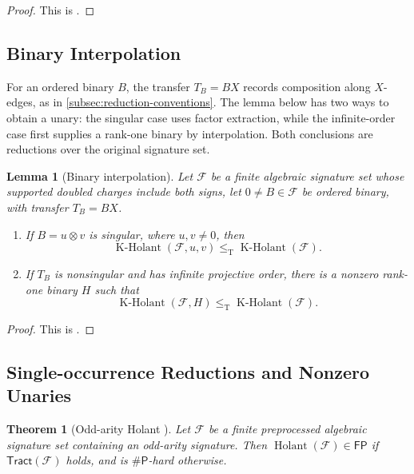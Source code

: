 \documentclass[11pt,letterpaper,onecolumn]{article}
\theoremstyle{plain}
\newtheorem{theorem}{Theorem}[section]
\newtheorem{lemma}[lemma]{Lemma}
\theoremstyle{definition}
\theoremstyle{remark}
\newcommand{\cF}{\mathcal F}
\newcommand{\Holant}{\operatorname{Holant}}
\newcommand{\KHolant}{\operatorname{K\text{-}Holant}}
\newcommand{\Tract}{\mathsf{Tract}}
\newcommand{\FP}{\mathsf{FP}}
\newcommand{\SharpP}{\#\mathsf P}
\newcommand{\leT}{\leq_{\mathrm T}}
\begin{document}
	\begin{proof}
		This is \cite[Lemma~2.25]{Liu2026DEQ2Holant}.
	\end{proof}
	
	
	\subsection{Binary Interpolation}
	\label{proofsubsec:central-descent}

For an ordered binary \(B\), the transfer \(T_B=BX\) records composition
along \(X\)-edges, as in \cref{subsec:reduction-conventions}.
The lemma below has two ways to obtain a unary: the singular case uses
factor extraction, while the infinite-order case first supplies a rank-one
binary by interpolation.  Both conclusions are reductions over the
original signature set.
	
	\begin{lemma}[Binary interpolation]
		\label{lem:binary-interpolation}
		Let \(\cF\) be a finite algebraic signature set whose supported doubled
		charges include both signs, let
		\(0\ne B\in\cF\) be ordered binary, with transfer \(T_B=BX\).
		\begin{enumerate}
			\item If \(B=u\otimes v\) is singular, where \(u,v\ne0\), then
			\[
			\KHolant(\cF,u,v)\leT\KHolant(\cF).
			\]
			\item If \(T_B\) is nonsingular and has infinite projective order, there is
			a nonzero rank-one binary \(H\) such that
			\[
			\KHolant(\cF,H)\leT\KHolant(\cF).
			\]
		\end{enumerate}
	\end{lemma}
	
	\begin{proof}
		This is \cite[Lemma~3.1]{Liu2026DEQ2Holant}.
	\end{proof}
	
	\subsection{Single-occurrence Reductions and Nonzero Unaries}
	\label{subsec:single-occurrence-carriers}

	\begin{theorem}[Odd-arity Holant
		{\cite[full version, Theorem~33; conference version, Theorem~30]{MengWangXiaZheng2025}}]
		\label{thm:external-odd}
		Let \(\cF\) be a finite preprocessed algebraic signature set containing an
		odd-arity signature.  Then \(\Holant(\cF)\in\FP\) if
		\(\Tract(\cF)\) holds, and is \(\SharpP\)-hard otherwise.
	\end{theorem}
	
\end{document}
